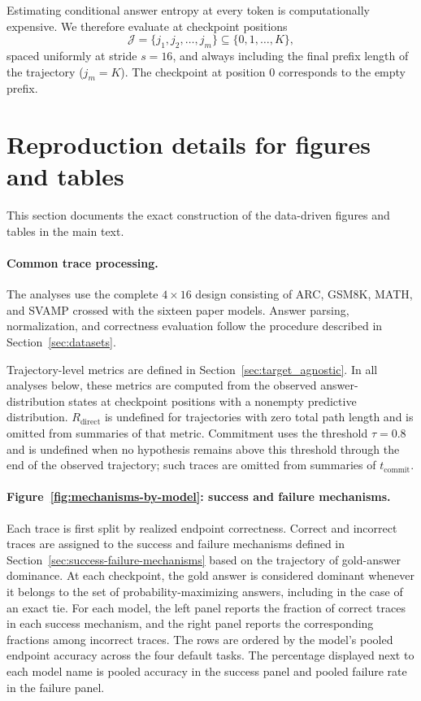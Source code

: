 \documentclass{article}
\begin{document}
Estimating conditional answer entropy at every token is computationally expensive. We therefore evaluate at checkpoint positions
\[
\mathcal{J} = \{j_1, j_2, \dots, j_m\} \subseteq \{0,1,\dots,K\},
\]
spaced uniformly at stride \(s=16\), and always including the final prefix length of the trajectory (\(j_m = K\)). The checkpoint at position \(0\) corresponds to the empty prefix.
\section{Reproduction details for figures and tables}
\label{app:visualization_reproduction}

This section documents the exact construction of the data-driven figures and tables in the main text.

\paragraph{Common trace processing.}
The analyses use the complete $4\times16$ design consisting of ARC, GSM8K, MATH, and SVAMP crossed with the sixteen paper models. Answer parsing, normalization, and correctness evaluation follow the procedure described in Section~\ref{sec:datasets}.

Trajectory-level metrics are defined in Section~\ref{sec:target_agnostic}. In all analyses below, these metrics are computed from the observed answer-distribution states at checkpoint positions with a nonempty predictive distribution. $R_{\mathrm{direct}}$ is undefined for trajectories with zero total path length and is omitted from summaries of that metric. Commitment uses the threshold $\tau=0.8$ and is undefined when no hypothesis remains above this threshold through the end of the observed trajectory; such traces are omitted from summaries of $t_{\mathrm{commit}}$.

\paragraph{Figure~\ref{fig:mechanisms-by-model}: success and failure mechanisms.}
Each trace is first split by realized endpoint correctness. Correct and incorrect traces are assigned to the success and failure mechanisms defined in Section~\ref{sec:success-failure-mechanisms} based on the trajectory of gold-answer dominance. At each checkpoint, the gold answer is considered dominant whenever it belongs to the set of probability-maximizing answers, including in the case of an exact tie. For each model, the left panel reports the fraction of correct traces in each success mechanism, and the right panel reports the corresponding fractions among incorrect traces. The rows are ordered by the model's pooled endpoint accuracy across the four default tasks. The percentage displayed next to each model name is pooled accuracy in the success panel and pooled failure rate in the failure panel.
\end{document}
